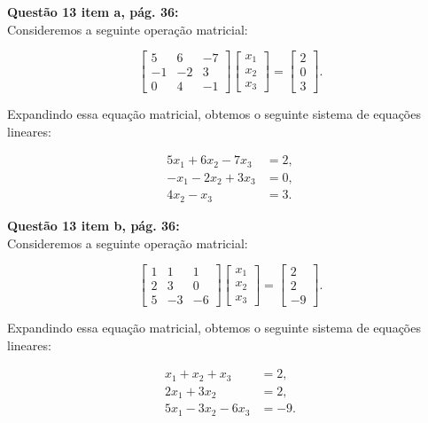 \documentclass[a4paper,12pt]{article}
\begin{document}

\textbf{Questão 13 item a, pág. 36:}\\

Consideremos a seguinte operação matricial:

\[
\begin{bmatrix} 
5 & 6 & -7 \\ 
-1 & -2 & 3 \\ 
0 & 4 & -1 
\end{bmatrix} 
\begin{bmatrix} 
x_1 \\ 
x_2 \\ 
x_3
\end{bmatrix} =
\begin{bmatrix} 
2 \\ 
0 \\ 
3
\end{bmatrix}.
\]

Expandindo essa equação matricial, obtemos o seguinte sistema de equações lineares:

\[
\begin{aligned}
5x_1 + 6x_2 - 7x_3 &= 2, \\
-x_1 - 2x_2 + 3x_3 &= 0, \\
4x_2 - x_3 &= 3.
\end{aligned}
\]


\textbf{Questão 13 item b, pág. 36:}\\

Consideremos a seguinte operação matricial:

\[
\begin{bmatrix} 
1 & 1 & 1 \\ 
2 & 3 & 0 \\ 
5 & -3 & -6 
\end{bmatrix} 
\begin{bmatrix} 
x_1 \\ 
x_2 \\ 
x_3
\end{bmatrix} =
\begin{bmatrix} 
2 \\ 
2 \\ 
-9
\end{bmatrix}.
\]

Expandindo essa equação matricial, obtemos o seguinte sistema de equações lineares:

\[
\begin{aligned}
x_1 + x_2 + x_3 &= 2, \\
2x_1 + 3x_2 &= 2, \\
5x_1 - 3x_2 - 6x_3 &= -9.
\end{aligned}
\]
\end{document}
